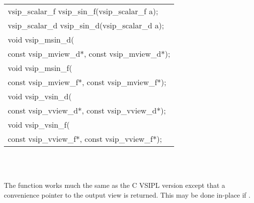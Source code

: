 \\\cvsiplh
\afh
\\\hspace*{.04\textwidth} {
\ttfamily
\begin{tabular}[H]{l}
vsip\_scalar\_f vsip\_sin\_f(vsip\_scalar\_f a);\\
vsip\_scalar\_d vsip\_sin\_d(vsip\_scalar\_d a);\\
void vsip\_msin\_d(\\*
\hspace{1cm}const vsip\_mview\_d*, const vsip\_mview\_d*);\\
void vsip\_msin\_f(\\*
\hspace{1cm}const vsip\_mview\_f*, const vsip\_mview\_f*);\\
void vsip\_vsin\_d(\\*
\hspace{1cm}const vsip\_vview\_d*, const vsip\_vview\_d*);\\
void vsip\_vsin\_f(\\*
\hspace{1cm}const vsip\_vview\_f*, const vsip\_vview\_f*);\\
\end{tabular}
}
\\\pyjvsiph
{}
\\\hspace*{.06\textwidth}\parbox{.93\textwidth}{\vspace*{.005\textheight}The  function works much the same as the C VSIPL version except that a convenience pointer to the output view is returned. This may be done in-place if .}
